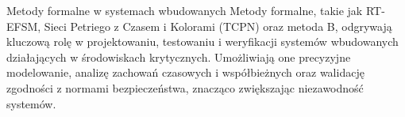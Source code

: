 \documentclass{purdue-poster}
\begin{document}
\begin{frame}{}
\begin{columns}[T]
\begin{column}{.48\linewidth}
    \begin{block}{Metody formalne w systemach wbudowanych}
    Metody formalne, takie jak RT-EFSM, Sieci Petriego z Czasem i Kolorami (TCPN) oraz metoda B, odgrywają kluczową rolę w projektowaniu, 
    testowaniu i weryfikacji systemów wbudowanych działających w środowiskach krytycznych. Umożliwiają one precyzyjne modelowanie, analizę zachowań czasowych i 
    współbieżnych oraz walidację zgodności z normami bezpieczeństwa, znacząco zwiększając niezawodność systemów.
    \end{block}



    

        

\end{column}
\end{columns}
\end{frame}
\end{document}
